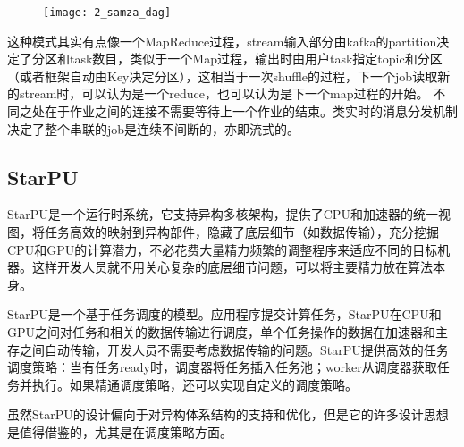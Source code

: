 \begin{figure}[!htbp]
    \centering
    \texttt{[image: 2\_samza\_dag]}
    \label{fig:2_samza_dag}
\end{figure}

这种模式其实有点像一个MapReduce过程，stream输入部分由kafka的partition决定了分区和task数目，类似于一个Map过程，输出时由用户task指定topic和分区（或者框架自动由Key决定分区），这相当于一次shuffle的过程，下一个job读取新的stream时，可以认为是一个reduce，也可以认为是下一个map过程的开始。
不同之处在于作业之间的连接不需要等待上一个作业的结束。类实时的消息分发机制决定了整个串联的job是连续不间断的，亦即流式的。

\subsection{StarPU}

StarPU\citep{augonnet2011starpu}是一个运行时系统，它支持异构多核架构，提供了CPU和加速器的统一视图，将任务高效的映射到异构部件，隐藏了底层细节（如数据传输），充分挖掘CPU和GPU的计算潜力，不必花费大量精力频繁的调整程序来适应不同的目标机器。这样开发人员就不用关心复杂的底层细节问题，可以将主要精力放在算法本身。

StarPU是一个基于任务调度的模型。应用程序提交计算任务，StarPU在CPU和GPU之间对任务和相关的数据传输进行调度，单个任务操作的数据在加速器和主存之间自动传输，开发人员不需要考虑数据传输的问题。StarPU提供高效的任务调度策略：当有任务ready时，调度器将任务插入任务池；worker从调度器获取任务并执行。如果精通调度策略，还可以实现自定义的调度策略。

虽然StarPU的设计偏向于对异构体系结构的支持和优化，但是它的许多设计思想是值得借鉴的，尤其是在调度策略方面。



